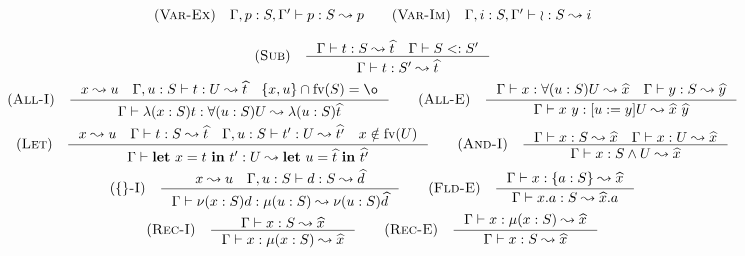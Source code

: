 \[\begin{array}{c}
    \RULE{Var-Ex} \quad \TJ{\Gamma, p: S, \Gamma'}{p}{S}{p} \qquad

    \RULE{Var-Im} \quad \TJ{\Gamma, i: S, \Gamma'}{\IMP}{S}{i} \\[4mm]

    \RULE{Sub} \quad \inference{
        \TJ{\Gamma}{t}{S}{\HAT{t}} \quad
        \SJT{\Gamma}{S}{S'}
    }{
        \TJ{\Gamma}{t}{S'}{\HAT{t}}
    } \\[4mm]

    \RULE{All-I} \quad \inference{
        x \leadsto u \quad
        \TJ{\Gamma, u: S}{t}{U}{\HAT{t}} \quad
        \{x, u\} \cap \FV{S} = \o
    }{
        \TJ{\Gamma}{\ABS{x}{S}{t}}{\DFUN{u}{S}{U}}{\ABS{u}{S}{\HAT{t}}}
    } \qquad

    \RULE{All-E} \quad \inference{
        \TJ{\Gamma}{x}{\DFUN{u}{S}{U}}{\HAT{x}} \quad
        \TJ{\Gamma}{y}{S}{\HAT{y}}
    }{
        \TJ{\Gamma}{x\ y}{\SUB{u}{y}U}{\HAT{x}\ \HAT{y}}
    } \\[4mm]

    \RULE{Let} \quad \inference{
        x \leadsto u \quad
        \TJ{\Gamma}{t}{S}{\HAT{t}} \quad
        \TJ{\Gamma, u: S}{t'}{U}{\HAT{t'}} \quad
        x \notin \FV{U}
    }{
        \TJ{\Gamma}{\LET{x}{t}{t'}}{U}{\LET{u}{\HAT{t}}{\HAT{t'}}}
    } \qquad

    \RULE{And-I} \quad \inference{
        \TJ{\Gamma}{x}{S}{\HAT{x}} \quad
        \TJ{\Gamma}{x}{U}{\HAT{x}}
    }{
        \TJ{\Gamma}{x}{\AGG{S}{U}}{\HAT{x}}
    } \\[4mm]

    \RULE{\{\}-I} \quad \inference{
        x \leadsto u \quad
        \TJ{\Gamma, u: S}{d}{S}{\HAT{d}}
    }{
        \TJ{\Gamma}{\OBJ{x}{S}{d}}{\REC{u}{S}}{\OBJ{u}{S}{\HAT{d}}}
    } \qquad

    \RULE{Fld-E} \quad \inference{
        \TJ{\Gamma}{x}{\FDEC{a}{S}}{\HAT{x}}
    }{
        \TJ{\Gamma}{x.a}{S}{\HAT{x}.a}
    } \\[4mm]

    \RULE{Rec-I} \quad \inference{
        \TJ{\Gamma}{x}{S}{\HAT{x}}
    }{
        \TJ{\Gamma}{x}{\REC{x}{S}}{\HAT{x}}
    } \qquad

    \RULE{Rec-E} \quad \inference{
        \TJ{\Gamma}{x}{\REC{x}{S}}{\HAT{x}}
    }{
        \TJ{\Gamma}{x}{S}{\HAT{x}}
    }
\end{array}\]
